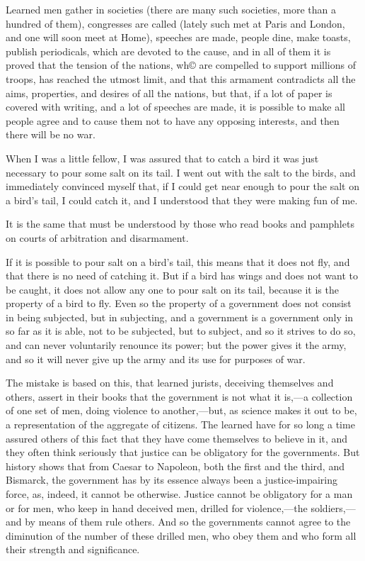 \documentclass{book}
\begin{document}
Learned men gather in societies (there are many such societies, more than a hundred of them), congresses are called (lately such met at Paris and London, and one will soon meet at Home), speeches are made, people dine, make toasts, publish periodicals, which are devoted to the cause, and in all of them it is proved that the tension of the nations, wh© are compelled to support millions of troops, has reached the utmost limit, and that this armament contradicts all the aims, properties, and desires of all the nations, but that, if a lot of paper is covered with writing, and a lot of speeches are made, it is possible to make all people agree and to cause them not to have any opposing interests, and then there will be no war.

When I was a little fellow, I was assured that to catch a bird it was just necessary to pour some salt on its tail. I went out with the salt to the birds, and immediately convinced myself that, if I could get near enough to pour the salt on a bird’s tail, I could catch it, and I understood that they were making fun of me.

It is the same that must be understood by those who read books and pamphlets on courts of arbitration and disarmament.

If it is possible to pour salt on a bird’s tail, this means that it does not fly, and that there is no need of catching it. But if a bird has wings and does not want to be caught, it does not allow any one to pour salt on its tail, because it is the property of a bird to fly. Even so the property of a government does not consist in being subjected, but in subjecting, and a government is a government only in so far as it is able, not to be subjected, but to subject, and so it strives to do so, and can never voluntarily renounce its power; but the power gives it the army, and so it will never give up the army and its use for purposes of war.

The mistake is based on this, that learned jurists, deceiving themselves and others, assert in their books that the government is not what it is,—a collection of one set of men, doing violence to another,—but, as science makes it out to be, a representation of the aggregate of citizens. The learned have for so long a time assured others of this fact that they have come themselves to believe in it, and they often think seriously that justice can be obligatory for the governments. But history shows that from Caesar to Napoleon, both the first and the third, and Bismarck, the government has by its essence always been a justice-impairing force, as, indeed, it cannot be otherwise. Justice cannot be obligatory for a man or for men, who keep in hand deceived men, drilled for violence,—the soldiers,—and by means of them rule others. And so the governments cannot agree to the diminution of the number of these drilled men, who obey them and who form all their strength and significance.
\end{document}
